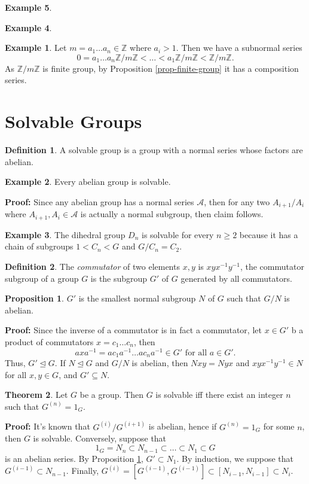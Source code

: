 \documentclass[11pt]{amsbook}%
\theoremstyle{plain}
\theoremstyle{definition}
\newtheorem{definition*}{Definition}
\newtheorem*{example*}{Example}
\newtheorem{proposition}[theorem]{Proposition}
\newtheorem{theorem}{Theorem}
\numberwithin{equation}{section}
\newcommand{\ZZ}{\mathbb Z}
\newcommand{\AK}{\mathcal A}
\renewcommand{\proof}{ \textbf{Proof: }}
\newcommand{\leftnormal}{\trianglelefteq}
\begin{document}
\begin{example*}
\begin{example*}
\begin{example*}
  Let $m = a_{1} \dots a_{n} \in \ZZ$ where $a_{i} > 1$. Then we have a subnormal series
  $$
  0 = a_{1} \dots a_{n} \ZZ/m\ZZ < \dots < a_{1}\ZZ/m\ZZ < \ZZ/m\ZZ.
  $$
  As $\ZZ/m\ZZ$ is finite group, by Proposition \ref{prop-finite-group} it has a composition series.
\end{example*}

\section{Solvable Groups}
\begin{definition*}
  A solvable group is a group with a normal series whose factors are abelian.
\end{definition*}

\begin{example*}
  Every abelian group is solvable.
\end{example*}
\proof Since any abelian group has a normal series $\AK$, then for any two $A_{i+1}/A_{i}$
where $A_{i+1}, A_{i} \in \AK$ is actually a normal subgroup, then claim follows. \qedsymbol

\begin{example*}
  The dihedral group $D_{n}$ is solvable for every $n \geq 2$ because it has a chain of subgroups $1 < C_{n} < G$
  and $G/C_{n} = C_{2}$.
\end{example*}

\begin{definition*}
  The \textit{commutator} of two elements $x, y$ is $xyx^{-1}y^{-1}$, the commutator subgroup of a group $G$
  is the subgroup $G'$ of $G$ generated by all commutators.
\end{definition*}

\begin{proposition}
  \label{prop-smallest-normal}
  $G'$ is the smallest normal subgroup $N$ of $G$ such that $G/N$ is abelian.
\end{proposition} \vspace{1.8em}
\proof Since the inverse of a commutator is in fact a commutator, let $x \in G'$
b a product of commutators $x = c_{1} \dots c_{n}$, then
$$
axa^{-1} = ac_{1}a^{-1} \dots ac_{n}a^{-1} \in G' \text{ for all } a \in G'.
$$
Thus, $G' \leftnormal G$. If $N \leftnormal G$ and $G/N$ is abelian, then $Nxy = Nyx$ and
$xyx^{-1}y^{-1} \in N$ for all $x, y \in G$, and $G' \subseteq N$. \qedsymbol

\begin{theorem}
  Let $G$ be a group. Then $G$ is solvable iff there exist an integer $n$ such that $G^{(n)} = 1_{G}$.
\end{theorem} \vspace{1.8em}
\proof It's known that $G^{(i)}/G^{(i+1)}$ is abelian, hence if $G^{(n)} = 1_{G}$ for some
$n$, then $G$ is solvable. Conversely, suppose that
$$
1_{G} = N_{n} \subset N_{n-1} \subset \dots \subset N_{1} \subset G
$$
is an abelian series. By Proposition \ref{prop-smallest-normal}, $G' \subset N_{1}$. By induction,
we suppose that $G^{(i-1)} \subset N_{n-1}$. Finally, $G^{(i)} = [G^{(i-1)}, G^{(i-1)}] \subset [N_{i-1}, N_{i-1}] \subset N_{i}$.
\qedsymbol


\end{example*}
\end{example*}
\end{document}
